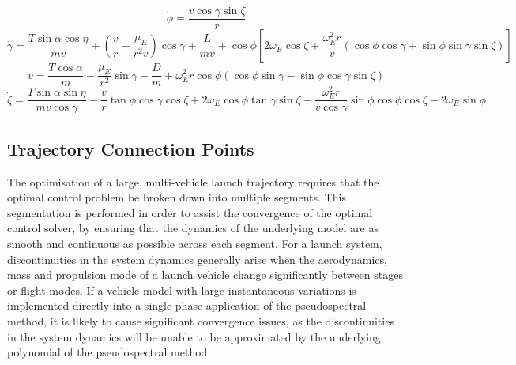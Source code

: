 \begin{equation}
\dot{\phi} = \frac{v\cos\gamma\sin\zeta}{r}
\end{equation}
\begin{equation}
\dot{\gamma} = \frac{T\sin\alpha \cos\eta}{mv} + (\frac{v}{r}-\frac{\mu_E}{r^2 v})\cos\gamma + \frac{L}{mv}
+ \cos\phi[2\omega_E \cos\zeta + \frac{\omega_E^2 r}{v}(\cos\phi\cos\gamma+\sin\phi\sin\gamma\sin\zeta)]
\end{equation}
\begin{equation}
\dot{v} = \frac{T\cos\alpha}{m}-\frac{\mu_E}{r^2}\sin\gamma - \frac{D}{m}
+ \omega_E^2 r\cos\phi(\cos\phi\sin\gamma-\sin\phi\cos\gamma\sin\zeta)
\end{equation}
\begin{equation}
\dot{\zeta} = \frac{T\sin\alpha \sin\eta}{mv \cos \gamma}-\frac{v}{r}\tan\phi\cos\gamma\cos\zeta +2\omega_E\cos\phi\tan\gamma\sin\zeta - \frac{\omega_E^2 r}{v\cos\gamma}\sin\phi\cos\phi\cos\zeta-2\omega_E\sin\phi 
\end{equation}

\subsection{Trajectory Connection Points}
The optimisation of a large, multi-vehicle launch trajectory requires that the optimal control problem be broken down into multiple segments. This segmentation is performed in order to assist the convergence of the optimal control solver, by ensuring that the dynamics of the underlying model are as smooth and continuous as possible across each segment. 
For a launch system, discontinuities in the system dynamics generally arise when the aerodynamics, mass and propulsion mode of a launch vehicle change significantly between stages or flight modes. 
If a vehicle model with large instantaneous variations is implemented directly into a single phase application of the pseudospectral method, it is likely to cause significant convergence issues, as the discontinuities in the system dynamics will be unable to be approximated by the underlying polynomial of the pseudospectral method. 
 
